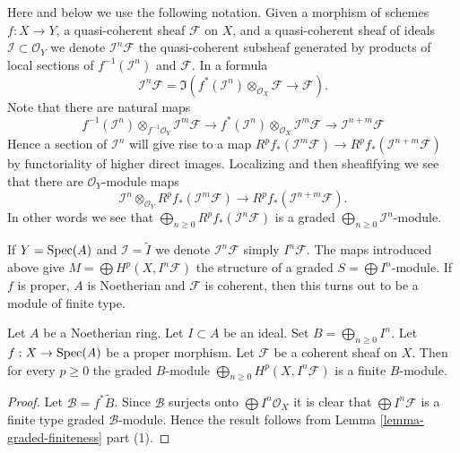 \medskip\noindent
Here and below we use the following notation.
Given a morphism of schemes $f : X \to Y$, a quasi-coherent sheaf
$\mathcal{F}$ on $X$, and a quasi-coherent sheaf of ideals
$\mathcal{I} \subset \mathcal{O}_Y$ we denote
$\mathcal{I}^n\mathcal{F}$ the quasi-coherent subsheaf generated
by products of local sections of $f^{-1}(\mathcal{I}^n)$ and
$\mathcal{F}$. In a formula
$$
\mathcal{I}^n\mathcal{F}
=
\Im\left(
f^*(\mathcal{I}^n) \otimes_{\mathcal{O}_X} \mathcal{F}
\longrightarrow
\mathcal{F}
\right).
$$
Note that there are natural maps
$$
f^{-1}(\mathcal{I}^n) \otimes_{f^{-1}\mathcal{O}_Y} \mathcal{I}^m\mathcal{F}
\longrightarrow
f^*(\mathcal{I}^n) \otimes_{\mathcal{O}_X} \mathcal{I}^m\mathcal{F}
\longrightarrow
\mathcal{I}^{n + m}\mathcal{F}
$$
Hence a section of $\mathcal{I}^n$ will give rise to a
map $R^pf_*(\mathcal{I}^m\mathcal{F}) \to
R^pf_*(\mathcal{I}^{n + m}\mathcal{F})$ by functoriality
of higher direct images. Localizing and then sheafifying we
see that there are $\mathcal{O}_Y$-module maps
$$
\mathcal{I}^n \otimes_{\mathcal{O}_Y} R^pf_*(\mathcal{I}^m\mathcal{F})
\longrightarrow
R^pf_*(\mathcal{I}^{n + m}\mathcal{F}).
$$
In other words we see that
$\bigoplus_{n \geq 0} R^pf_*(\mathcal{I}^n\mathcal{F})$
is a graded $\bigoplus_{n \geq 0} \mathcal{I}^n$-module.

\medskip\noindent
If $Y = \mathop{\mathrm{Spec}}(A)$ and $\mathcal{I} = \widetilde{I}$ we denote
$\mathcal{I}^n\mathcal{F}$ simply $I^n\mathcal{F}$. The maps
introduced above give $M = \bigoplus H^p(X, I^n\mathcal{F})$ the
structure of a graded $S = \bigoplus I^n$-module. If $f$ is proper,
$A$ is Noetherian and $\mathcal{F}$ is coherent, then this turns out
to be a module of finite type.

\begin{lemma}
\label{lemma-cohomology-powers-ideal-times-F}
\begin{reference}
\cite[III Cor 3.3.2]{EGA}
\end{reference}
Let $A$ be a Noetherian ring.
Let $I \subset A$ be an ideal.
Set $B = \bigoplus_{n \geq 0} I^n$.
Let $f : X \to \mathop{\mathrm{Spec}}(A)$ be a proper morphism.
Let $\mathcal{F}$ be a coherent sheaf on $X$.
Then for every $p \geq 0$ the graded $B$-module
$\bigoplus_{n \geq 0} H^p(X, I^n\mathcal{F})$ is
a finite $B$-module.
\end{lemma}

\begin{proof}
Let $\mathcal{B} = f^*\widetilde{B}$. Since $\mathcal{B}$ surjects
onto $\bigoplus I^n\mathcal{O}_X$ it is clear that
$\bigoplus I^n\mathcal{F}$ is a finite type graded $\mathcal{B}$-module.
Hence the result follows from Lemma \ref{lemma-graded-finiteness} part (1).
\end{proof}

